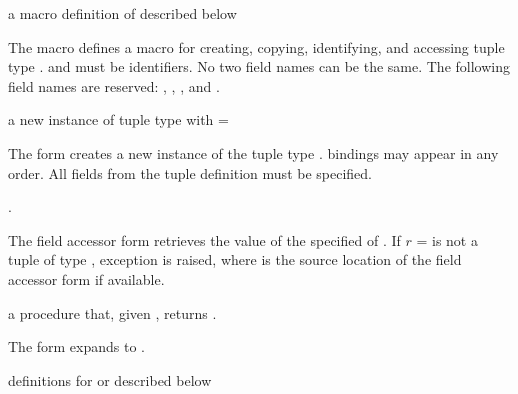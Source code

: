 \begin{syntax}
\end{syntax}
\expandsto{} a macro definition of  described below

The  macro defines a macro for creating,
copying, identifying, and accessing tuple type . 
and  \etc{} must be identifiers. No two field names can be
the same. The following field names are reserved: ,
, , and .

\begin{syntax}
\end{syntax}
\returns{} a new instance of tuple type  with  =
 \etc{}

The  form creates a new instance of the tuple type
.  bindings may appear in any order. All fields
from the tuple definition must be specified.

\begin{syntax}
\end{syntax}
\returns{} .

The field accessor form retrieves the value of the specified
 of . If $r$ =  is not a tuple
of type , exception  is raised, where  is the source location of the
field accessor form if available.

\begin{syntax}
\end{syntax}
\returns{} a procedure that, given , returns .

The  form expands to .

\begin{syntax}
\end{syntax}
\expandsto{} definitions for  \etc{} or  \etc{} described below

